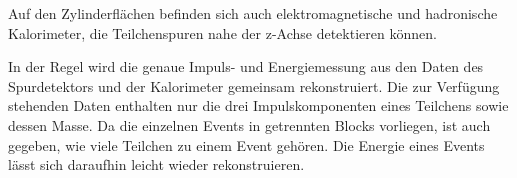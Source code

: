 Auf den Zylinderflächen befinden sich auch elektromagnetische und hadronische Kalorimeter, die Teilchenspuren nahe der z-Achse detektieren können.

In der Regel wird die genaue Impuls- und Energiemessung aus den Daten des Spurdetektors und der Kalorimeter gemeinsam rekonstruiert. Die zur Verfügung stehenden Daten enthalten nur die drei Impulskomponenten eines Teilchens sowie dessen Masse. Da die einzelnen Events in getrennten Blocks vorliegen, ist auch gegeben, wie viele Teilchen zu einem Event gehören. Die Energie eines Events lässt sich daraufhin leicht wieder rekonstruieren.
